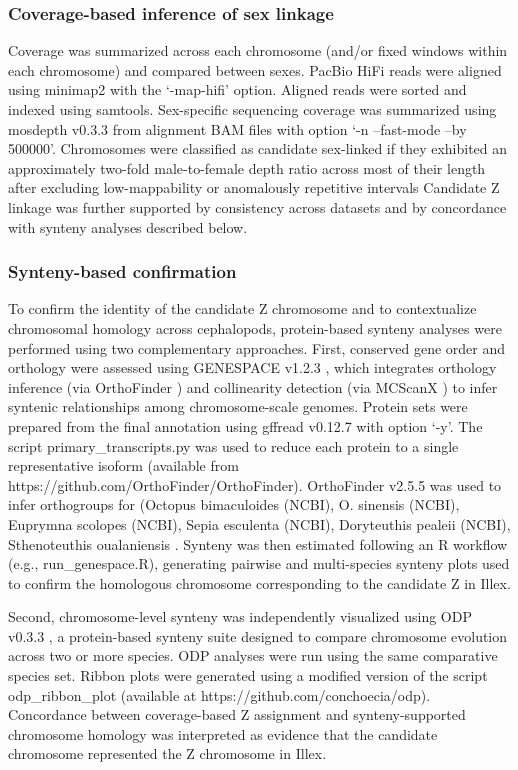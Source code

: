\documentclass[11pt]{article}
\begin{document}
\subsubsection{Coverage-based inference of sex linkage }
Coverage was summarized across each chromosome (and/or fixed windows within each chromosome) and compared between sexes. PacBio HiFi reads were aligned using minimap2 with the ‘-map-hifi’ option. Aligned reads were sorted and indexed using samtools. Sex-specific sequencing coverage was summarized using mosdepth v0.3.3 \cite{Pedersen2018Mosdepth} from alignment BAM files with option ‘-n --fast-mode --by 500000’. Chromosomes were classified as candidate sex-linked if they exhibited an approximately two-fold male-to-female depth ratio across most of their length after excluding low-mappability or anomalously repetitive intervals Candidate Z linkage was further supported by consistency across datasets and by concordance with synteny analyses described below.

\subsubsection{Synteny-based confirmation}

To confirm the identity of the candidate Z chromosome and to contextualize chromosomal homology across cephalopods, protein-based synteny analyses were performed using two complementary approaches. First, conserved gene order and orthology were assessed using GENESPACE v1.2.3 \cite{Lovell2022GENESPACE}, which integrates orthology inference (via OrthoFinder \cite{Emms2019OrthoFinder}) and collinearity detection (via MCScanX \cite{Wang2012MCScanX}) to infer syntenic relationships among chromosome-scale genomes. Protein sets were prepared from the final annotation using gffread v0.12.7 with option ‘-y’. The script primary\_transcripts.py was used to reduce each protein to a single representative isoform (available from https://github.com/OrthoFinder/OrthoFinder). OrthoFinder v2.5.5 \cite{Emms2019OrthoFinder} was used to infer orthogroups for (Octopus bimaculoides (NCBI), O. sinensis (NCBI), Euprymna scolopes (NCBI), Sepia esculenta (NCBI), Doryteuthis pealeii (NCBI), Sthenoteuthis oualaniensis \cite{Li2022FlyingSquid}. Synteny was then estimated following an R workflow (e.g., run\_genespace.R), generating pairwise and multi-species synteny plots used to confirm the homologous chromosome corresponding to the candidate Z in Illex.

Second, chromosome-level synteny was independently visualized using ODP v0.3.3 \cite{Schultz2024ODPv033}, a protein-based synteny suite designed to compare chromosome evolution across two or more species. ODP analyses were run using the same comparative species set. Ribbon plots were generated using a modified version of the script odp\_ribbon\_plot (available at https://github.com/conchoecia/odp). Concordance between coverage-based Z assignment and synteny-supported chromosome homology was interpreted as evidence that the candidate chromosome represented the Z chromosome in Illex.
\end{document}
